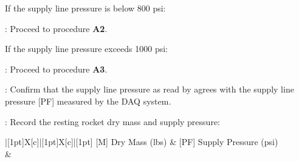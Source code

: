 \begin{checklist}
    \begin{checklist}[label=$\bullet$]
        \item If the supply line pressure is below 800 psi:
        \begin{checklist}
            \item \ops{}: Proceed to procedure \textbf{A2}.
        \end{checklist}
        \item If the supply line pressure exceeds 1000 psi:
        \begin{checklist}
            \item \ops{}: Proceed to procedure \textbf{A3}.
        \end{checklist}
    \end{checklist}
    \item \control: Confirm that the supply line pressure as read by \primary{} agrees with the supply line pressure [PF] measured by the DAQ system.
    \item \ops{}: Record the resting rocket dry mass and supply pressure:

    \begin{tabu} to \textwidth { |[1pt]X[c]|[1pt]X[c]|[1pt] }
    \tabucline[1pt]{}
    [M] Dry Mass (lbs) & [PF] Supply Pressure (psi) \\
    \tabucline[1pt]{}
    \vspace{1in} & \\
    \tabucline[1pt]{}
    \end{tabu}


\end{checklist}
